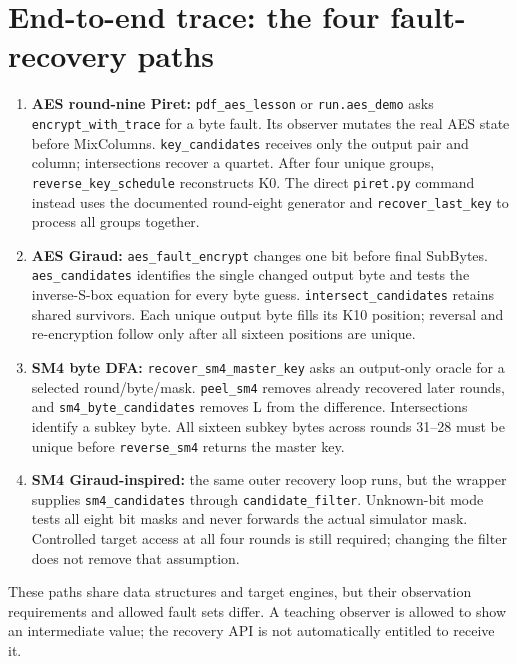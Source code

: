 \section{End-to-end trace: the four fault-recovery paths}
\begin{enumerate}
\item \textbf{AES round-nine Piret:} \texttt{pdf\_\allowbreak{}aes\_\allowbreak{}lesson} or \texttt{run.aes\_\allowbreak{}demo} asks \texttt{encrypt\_\allowbreak{}with\_\allowbreak{}trace} for a byte fault. Its observer mutates the real AES state before MixColumns. \texttt{key\_\allowbreak{}candidates} receives only the output pair and column; intersections recover a quartet. After four unique groups, \texttt{reverse\_\allowbreak{}key\_\allowbreak{}schedule} reconstructs K0. The direct \texttt{piret.py} command instead uses the documented round-eight generator and \texttt{recover\_\allowbreak{}last\_\allowbreak{}key} to process all groups together.
\item \textbf{AES Giraud:} \texttt{aes\_\allowbreak{}fault\_\allowbreak{}encrypt} changes one bit before final SubBytes. \texttt{aes\_\allowbreak{}candidates} identifies the single changed output byte and tests the inverse-S-box equation for every byte guess. \texttt{intersect\_\allowbreak{}candidates} retains shared survivors. Each unique output byte fills its K10 position; reversal and re-encryption follow only after all sixteen positions are unique.
\item \textbf{SM4 byte DFA:} \texttt{recover\_\allowbreak{}sm4\_\allowbreak{}master\_\allowbreak{}key} asks an output-only oracle for a selected round/byte/mask. \texttt{peel\_\allowbreak{}sm4} removes already recovered later rounds, and \texttt{sm4\_\allowbreak{}byte\_\allowbreak{}candidates} removes L from the difference. Intersections identify a subkey byte. All sixteen subkey bytes across rounds 31--28 must be unique before \texttt{reverse\_\allowbreak{}sm4} returns the master key.
\item \textbf{SM4 Giraud-inspired:} the same outer recovery loop runs, but the wrapper supplies \texttt{sm4\_\allowbreak{}candidates} through \texttt{candidate\_\allowbreak{}filter}. Unknown-bit mode tests all eight bit masks and never forwards the actual simulator mask. Controlled target access at all four rounds is still required; changing the filter does not remove that assumption.
\end{enumerate}
These paths share data structures and target engines, but their observation requirements and allowed fault sets differ. A teaching observer is allowed to show an intermediate value; the recovery API is not automatically entitled to receive it.

